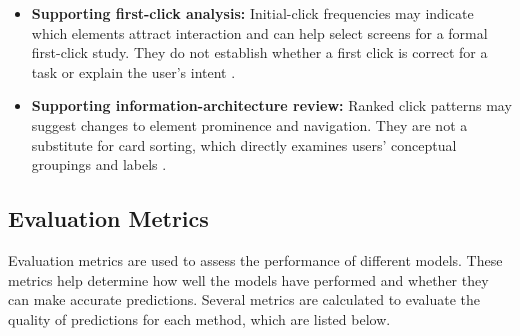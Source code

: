 \documentclass[sn-mathphys-num, Numbered]{sn-jnl}%
\theoremstyle{thmstyleone}%
\theoremstyle{thmstyletwo}%
\theoremstyle{thmstylethree}%
\providecommand{\DIFadd}[1]{{\protect\color{green!40!black}#1}} %
\providecommand{\DIFdel}[1]{}                      %
\providecommand{\DIFaddbegin}{} %
\providecommand{\DIFaddend}{} %
\providecommand{\DIFdelbegin}{} %
\providecommand{\DIFdelend}{} %
\newcommand{\DIFscaledelfig}{0.5}
\newlength{\DIFdelgraphicswidth} %
\newlength{\DIFdelgraphicsheight} %
\newcommand{\DIFaddincludegraphics}[2][]{{\color{blue}\fbox{\DIFOincludegraphics[#1]{#2}}}} %
\newcommand{\DIFdelincludegraphics}[2][]{%
\sbox{\DIFdelgraphicsbox}{\DIFOincludegraphics[#1]{#2}}%
\settoboxwidth{\DIFdelgraphicswidth}{\DIFdelgraphicsbox} %
\settoboxtotalheight{\DIFdelgraphicsheight}{\DIFdelgraphicsbox} %
\scalebox{\DIFscaledelfig}{%
\parbox[b]{\DIFdelgraphicswidth}{\usebox{\DIFdelgraphicsbox}\\[-\baselineskip] \rule{\DIFdelgraphicswidth}{0em}}\llap{\resizebox{\DIFdelgraphicswidth}{\DIFdelgraphicsheight}{%
\setlength{\unitlength}{\DIFdelgraphicswidth}%
\begin{picture}(1,1)%
\thicklines\linethickness{2pt} %
{\color[rgb]{1,0,0}\put(0,0){\framebox(1,1){}}}%
{\color[rgb]{1,0,0}\put(0,0){\line( 1,1){1}}}%
{\color[rgb]{1,0,0}\put(0,1){\line(1,-1){1}}}%
\end{picture}%
}\hspace*{3pt}}} %
} %
\DeclareRobustCommand{\DIFaddbegin}{\DIFOaddbegin \let\includegraphics\DIFaddincludegraphics} %
\DeclareRobustCommand{\DIFaddend}{\DIFOaddend \let\includegraphics\DIFOincludegraphics} %
\DeclareRobustCommand{\DIFdelbegin}{\DIFOdelbegin \let\includegraphics\DIFdelincludegraphics} %
\DeclareRobustCommand{\DIFdelend}{\DIFOaddend \let\includegraphics\DIFOincludegraphics} %
\begin{document}
\begin{itemize} \item \textbf{\DIFdelbegin \DIFdel{First Click Testing with neural network architectures to improve user experience}\DIFdelend \DIFaddbegin \DIFadd{Supporting first-click analysis}\DIFaddend :} \DIFdelbegin \DIFdel{For conducting usability testing with LSTM and Transformer architectures, the user's first click in the sequences is filtered to understand the user's initial reaction when first interacting with the application. This is important for identifying elements that are frequently used during }\DIFdelend \DIFaddbegin \DIFadd{Initial-click frequencies may indicate which elements attract interaction and can help select screens for a formal first-click study. They do not establish whether a first click is correct for a task or explain }\DIFaddend the user's \DIFdelbegin \DIFdel{first encounter }\DIFdelend \DIFaddbegin \DIFadd{intent }\DIFaddend \cite{falkowska2022replication}.
	\item \textbf{\DIFdelbegin \DIFdel{Card sorting test with neural network architectures to improve user experience}\DIFdelend \DIFaddbegin \DIFadd{Supporting information-architecture review}\DIFaddend :}
	\DIFdelbegin \DIFdel{For conducting card sorting with LSTM and Transformer architectures, it is sufficient to predict all clickable elements on the page and then sort them in descending order. The results are useful for understanding the visual hierarchy within the application. 
	Analyzing the data from this method helps UX designers discover user patterns when interacting with pages, thereby optimizing the software structure to be more user-centered }\DIFdelend \DIFaddbegin \DIFadd{Ranked click patterns may suggest changes to element prominence and navigation. They are not a substitute for card sorting, which directly examines users' conceptual groupings and labels }\DIFaddend \cite{nawaz2012comparison}.

\end{itemize}


\subsection{Evaluation Metrics}
Evaluation metrics are used to assess the performance of different models. These metrics help determine how well the models have performed and whether they can make accurate predictions. Several metrics are calculated to evaluate the quality of predictions for each method, which are listed below.
\end{document}

